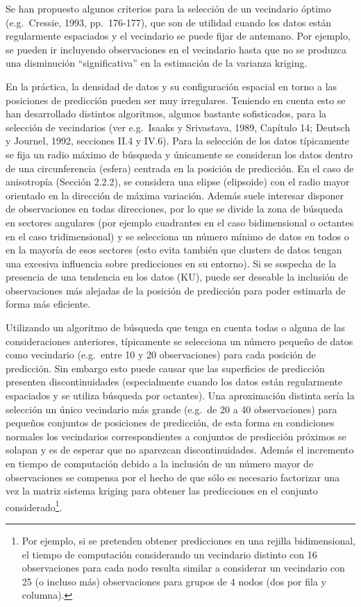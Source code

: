 \documentclass[
]{book}
\theoremstyle{break}
\theoremstyle{definition}
\theoremstyle{definition}
\theoremstyle{definition}
\theoremstyle{definition}
\theoremstyle{remark}
\begin{document}
Se han propuesto algunos criterios para la selección de un vecindario óptimo (e.g.~Cressie, 1993, pp.~176-177), que son de utilidad cuando los datos están regularmente espaciados y el vecindario se puede fijar de antemano.
Por ejemplo, se pueden ir incluyendo observaciones en el vecindario hasta que no se produzca una disminución ``significativa'' en la estimación de la varianza kriging.

En la práctica, la densidad de datos y su configuración espacial en torno a las posiciones de predicción pueden ser muy irregulares.
Teniendo en cuenta esto se han desarrollado distintos algoritmos, algunos bastante sofisticados, para la selección de vecindarios (ver e.g.~Isaaks y Srivastava, 1989, Capítulo 14; Deutsch y Journel, 1992, secciones II.4 y IV.6).
Para la selección de los datos típicamente se fija un radio máximo de búsqueda y únicamente se consideran los datos dentro de una circunferencia (esfera) centrada en la posición de predicción.
En el caso de anisotropía (Sección 2.2.2), se considera una elipse (elipsoide) con el radio mayor orientado en la dirección de máxima variación.
Además suele interesar disponer de observaciones en todas direcciones, por lo que se divide la zona de búsqueda en sectores angulares (por ejemplo cuadrantes en el caso bidimensional o octantes en el caso tridimensional) y se selecciona un número mínimo de datos en todos o en la mayoría de esos sectores (esto evita también que clusters de datos tengan una excesiva influencia sobre predicciones en su entorno).
Si se sospecha de la presencia de una tendencia en los datos (KU), puede ser deseable la inclusión de observaciones más alejadas de la posición de predicción para poder estimarla de forma más eficiente.

Utilizando un algoritmo de búsqueda que tenga en cuenta todas o alguna de las consideraciones anteriores, típicamente se selecciona un número pequeño de datos como vecindario (e.g.~entre 10 y 20 observaciones) para cada posición de predicción.
Sin embargo esto puede causar que las superficies de predicción presenten discontinuidades (especialmente cuando los datos están regularmente espaciados y se utiliza búsqueda por octantes).
Una aproximación distinta sería la selección un único vecindario más grande (e.g.~de 20 a 40 observaciones) para pequeños conjuntos de posiciones de predicción, de esta forma en condiciones normales los vecindarios correspondientes a conjuntos de predicción próximos se solapan y es de esperar que no aparezcan discontinuidades.
Además el incremento en tiempo de computación debido a la inclusión de un número mayor de observaciones se compensa por el hecho de que sólo es necesario factorizar una vez la matriz sistema kriging para obtener las predicciones en el conjunto considerado\footnote{Por ejemplo, si se pretenden obtener predicciones en una rejilla bidimensional, el tiempo de computación considerando un vecindario distinto con 16 observaciones para cada nodo resulta similar a considerar un vecindario con 25 (o incluso más) observaciones para grupos de 4 nodos (dos por fila y columna).}.
\end{document}
